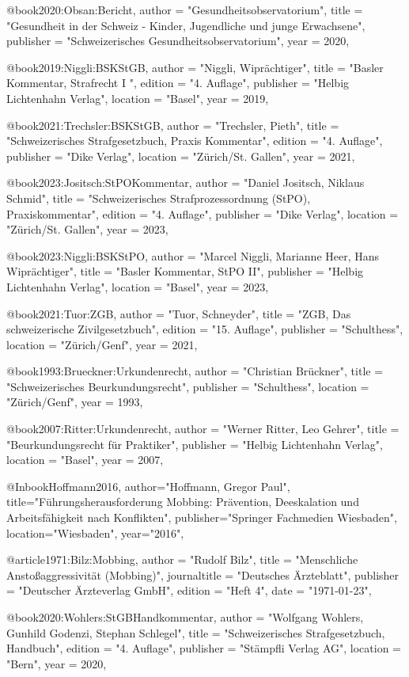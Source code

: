 @book{2020:Obsan:Bericht,
	author = "Gesundheitsobservatorium", 
	title = "Gesundheit in der Schweiz - Kinder, Jugendliche und junge Erwachsene",
	publisher = "Schweizerisches Gesundheitsobservatorium",
	year = 2020,
}

@book{2019:Niggli:BSKStGB,
	author  = "Niggli, Wiprächtiger",
	title = "Basler Kommentar, Strafrecht I ",
	edition = "4. Auflage",
	publisher = "Helbig Lichtenhahn Verlag",
	location = "Basel",
	year = 2019,
}

@book{2021:Trechsler:BSKStGB,
	author  = "Trechsler, Pieth",
	title = "Schweizerisches Strafgesetzbuch, Praxis Kommentar",
	edition = "4. Auflage",
	publisher = "Dike Verlag",
	location = "Zürich/St. Gallen",
	year = 2021,
}

@book{2023:Jositsch:StPOKommentar,
	author  = "Daniel Jositsch, Niklaus Schmid",
	title = "Schweizerisches Strafprozessordnung (StPO), Praxiskommentar",
	edition = "4. Auflage",
	publisher = "Dike Verlag",
	location = "Zürich/St. Gallen",
	year = 2023,
}

@book{2023:Niggli:BSKStPO,
	author  = "Marcel Niggli, Marianne Heer, Hans Wiprächtiger",
	title = "Basler Kommentar, StPO II",
	publisher = "Helbig Lichtenhahn Verlag",
	location = "Basel",
	year = 2023,
}


@book{2021:Tuor:ZGB,
	author  = "Tuor, Schneyder",
	title = "ZGB, Das schweizerische Zivilgesetzbuch",
	edition = "15. Auflage",
	publisher = "Schulthess",
	location = "Zürich/Genf",
	year = 2021,
}

@book{1993:Brueckner:Urkundenrecht,
	author  = "Christian Brückner",
	title = "Schweizerisches Beurkundungsrecht",
	publisher = "Schulthess",
	location = "Zürich/Genf",
	year = 1993,
}

@book{2007:Ritter:Urkundenrecht,
	author  = "Werner Ritter, Leo Gehrer",
	title = "Beurkundungsrecht für Praktiker",
	publisher = "Helbig Lichtenhahn Verlag",
	location = "Basel",
	year = 2007,
}

@Inbook{Hoffmann2016,
	author="Hoffmann, Gregor Paul",
	title="F{\"u}hrungsherausforderung Mobbing: Pr{\"a}vention, Deeskalation und Arbeitsf{\"a}higkeit nach Konflikten",
	publisher="Springer Fachmedien Wiesbaden",
	location="Wiesbaden",
	year="2016",
}

@article{1971:Bilz:Mobbing,
	author = "Rudolf Bilz",
	title = "Menschliche Anstoßaggressivität (Mobbing)",
	journaltitle = "Deutsches Ärzteblatt",
	publisher = "Deutscher Ärzteverlag GmbH",
	edition = "Heft 4",
	date = "1971-01-23",
}

@book{2020:Wohlers:StGBHandkommentar,
	author  = "Wolfgang Wohlers, Gunhild Godenzi, Stephan Schlegel",
	title = "Schweizerisches Strafgesetzbuch, Handbuch",
	edition = "4. Auflage",
	publisher = "Stämpfli Verlag AG",
	location = "Bern",
	year = 2020,
}


